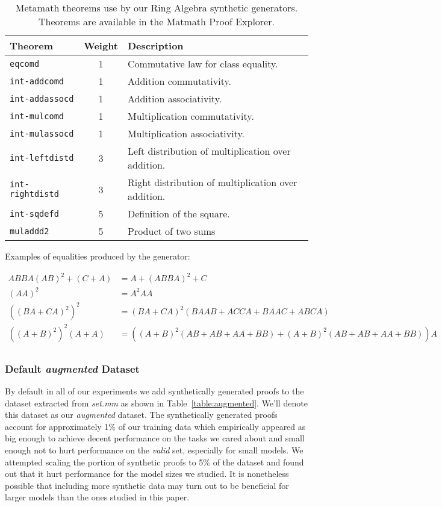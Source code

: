 \documentclass{article}
\begin{document}
\begin{table}[ht]
\caption{Metamath theorems use by our Ring Algebra synthetic generators. Theorems are available in the Matmath Proof Explorer.}
\centering
\begin{tabular}{ |l|c|l| }
    \hline
    Theorem & Weight & Description \\
    \hline
    \verb|eqcomd| & 1 & Commutative law for class equality. \\
    \verb|int-addcomd| & 1 & Addition commutativity. \\
    \verb|int-addassocd| & 1 & Addition associativity. \\
    \verb|int-mulcomd| & 1 & Multiplication commutativity. \\
    \verb|int-mulassocd| & 1 & Multiplication associativity. \\
    \verb|int-leftdistd| & 3 & Left distribution of multiplication over addition. \\
    \verb|int-rightdistd| & 3 & Right distribution of multiplication over addition. \\
    \verb|int-sqdefd| & 5 & Definition of the square. \\
    \verb|muladdd2| & 5 & Product of two sums \\
    \hline
\end{tabular}
\label{table:theorems}
\end{table}

Examples of equalities produced by the generator:

\begin{align*}
ABBA(AB)^2+(C+A) &= A+(ABBA)^2+C \\
(AA)^2 &= A^2AA \\
((BA+CA)^2)^2 &= (BA+CA)^2(BAAB+ACCA+BAAC+ABCA)\\
((A+B)^2)^2(A+A) &= ((A+B)^2(AB+AB+AA+BB)+ (A+B)^2(AB+AB+AA+BB))A \\
\end{align*}

\subsubsection{Default \textit{augmented} Dataset} 

By default in all of our experiments we add synthetically generated proofs to the dataset extracted from \textit{set.mm} as shown in Table~\ref{table:augmented}. We'll denote this dataset as our \textit{augmented} dataset. The synthetically generated proofs account for approximately 1\% of our training data which empirically appeared as big enough to achieve decent performance on the tasks we cared about and small enough not to hurt performance on the \textit{valid} set, especially for small models. We attempted scaling the portion of synthetic proofs to 5\% of the dataset and found out that it hurt performance for the model sizes we studied. It is nonetheless possible that including more synthetic data may turn out to be beneficial for larger models than the ones studied in this paper.
\end{document}

